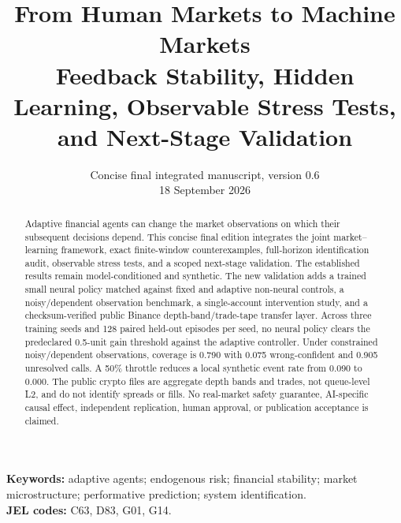 \documentclass[11pt,a4paper]{article}
\title{\textbf{From Human Markets to Machine Markets}\\[0.45em]
\large Feedback Stability, Hidden Learning, Observable Stress Tests, and Next-Stage Validation}
\author{}
\date{Concise final integrated manuscript, version 0.6\\18 September 2026}
\theoremstyle{definition}
\theoremstyle{remark}
\begin{document}
\maketitle
\vspace{-1.4em}
\begin{abstract}
Adaptive financial agents can change the market observations on which their subsequent decisions depend. This concise final edition integrates the joint market--learning framework, exact finite-window counterexamples, full-horizon identification audit, observable stress tests, and a scoped next-stage validation. The established results remain model-conditioned and synthetic. The new validation adds a trained small neural policy matched against fixed and adaptive non-neural controls, a noisy/dependent observation benchmark, a single-account intervention study, and a checksum-verified public Binance depth-band/trade-tape transfer layer. Across three training seeds and 128 paired held-out episodes per seed, no neural policy clears the predeclared 0.5-unit gain threshold against the adaptive controller. Under constrained noisy/dependent observations, coverage is 0.790 with 0.075 wrong-confident and 0.905 unresolved calls. A 50\% throttle reduces a local synthetic event rate from 0.090 to 0.000. The public crypto files are aggregate depth bands and trades, not queue-level L2, and do not identify spreads or fills. No real-market safety guarantee, AI-specific causal effect, independent replication, human approval, or publication acceptance is claimed.
\end{abstract}
\noindent\textbf{Keywords:} adaptive agents; endogenous risk; financial stability; market microstructure; performative prediction; system identification.\\
\textbf{JEL codes:} C63, D83, G01, G14.

\begin{center}
\end{center}
\end{document}
